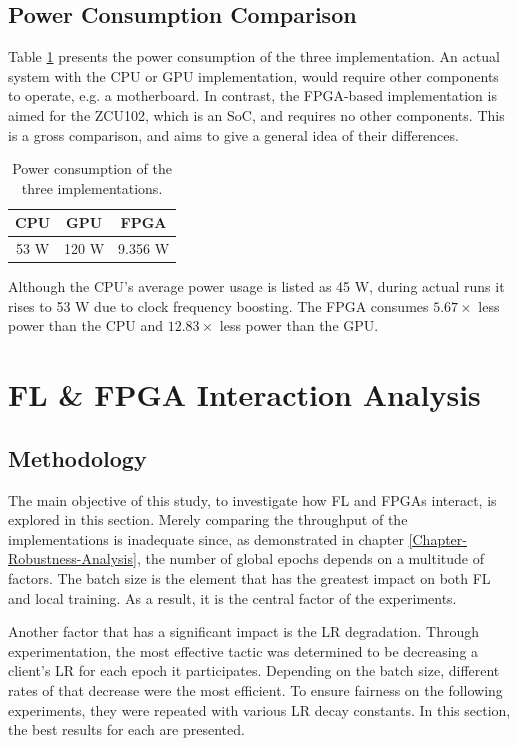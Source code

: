 \subsection{Power Consumption Comparison}
Table \ref{table: power} presents the power consumption of the three implementation. An actual system with the CPU or GPU implementation, would require other components to operate, e.g. a motherboard. In contrast, the FPGA-based implementation is aimed for the ZCU102, which is an SoC, and requires no other components. This is a gross comparison, and aims to give a general idea of their differences.
\begin{table}[H]
    \center
    \begin{tabular}
        { | c | c | c | }
        \hline
        CPU & GPU & FPGA\\
        \hline
        53 W & 120 W & 9.356 W\\ 
        \hline
    \end{tabular}
    \caption[Power Consumption]{Power consumption of the three implementations.}
    \label{table: power}
\end{table}
Although the CPU's average power usage is listed as 45 W, during actual runs it rises to 53 W due to clock frequency boosting. The FPGA consumes \(5.67\times\) less power than the CPU and \(12.83\times\) less power than the GPU.


\section{FL \& FPGA Interaction Analysis}
\subsection{Methodology}
The main objective of this study, to investigate how FL and FPGAs interact, is explored in this section. Merely comparing the throughput of the implementations is inadequate since, as demonstrated in chapter \ref{Chapter-Robustness-Analysis}, the number of global epochs depends on a multitude of factors. The batch size is the element that has the greatest impact on both FL and local training. As a result, it is the central factor of the experiments. %

Another factor that has a significant impact is the LR degradation. Through experimentation, the most effective tactic was determined to be decreasing a client's LR for each epoch it participates. Depending on the batch size, different rates of that decrease were the most efficient. To ensure fairness on the following experiments, they were repeated with various LR decay constants. In this section, the best results for each are presented. %

